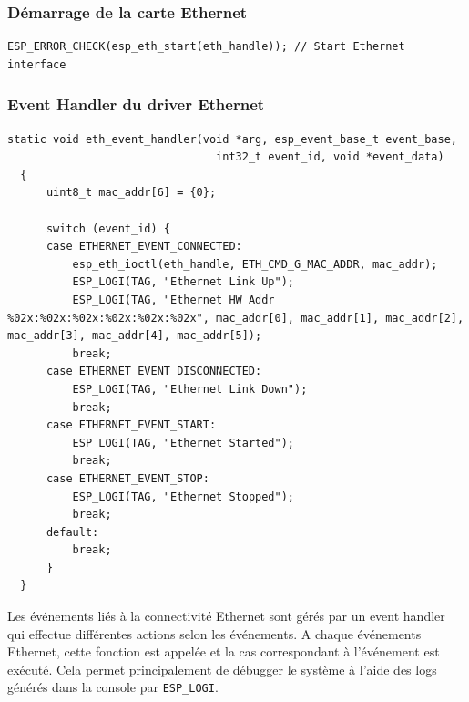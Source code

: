 \documentclass[a4paper,11pt]{article}
\begin{document}
        \vspace{0.5cm}
        \subsubsection{Démarrage de la carte Ethernet}
        \begin{lstlisting}[style=C, caption={Démarrage de la carte Ethernet}]
ESP_ERROR_CHECK(esp_eth_start(eth_handle)); // Start Ethernet interface
        \end{lstlisting}

        \newpage
        \subsubsection{Event Handler du driver Ethernet}
        \begin{lstlisting}[style=C, caption={Event Handler du driver Ethernet}]
  static void eth_event_handler(void *arg, esp_event_base_t event_base,
                                int32_t event_id, void *event_data)
  {
      uint8_t mac_addr[6] = {0};

      switch (event_id) {
      case ETHERNET_EVENT_CONNECTED:
          esp_eth_ioctl(eth_handle, ETH_CMD_G_MAC_ADDR, mac_addr);
          ESP_LOGI(TAG, "Ethernet Link Up");
          ESP_LOGI(TAG, "Ethernet HW Addr %02x:%02x:%02x:%02x:%02x:%02x", mac_addr[0], mac_addr[1], mac_addr[2], mac_addr[3], mac_addr[4], mac_addr[5]);
          break;
      case ETHERNET_EVENT_DISCONNECTED:
          ESP_LOGI(TAG, "Ethernet Link Down");
          break;
      case ETHERNET_EVENT_START:
          ESP_LOGI(TAG, "Ethernet Started");
          break;
      case ETHERNET_EVENT_STOP:
          ESP_LOGI(TAG, "Ethernet Stopped");
          break;
      default:
          break;
      }
  }
        \end{lstlisting}
        \vspace{0.5cm}

        Les événements liés à la connectivité Ethernet sont gérés par un event handler qui effectue différentes actions selon les événements.\newline
        A chaque événements Ethernet, cette fonction est appelée et la cas correspondant à l'événement est exécuté.\newline
        Cela permet principalement de débugger le système à l'aide des logs générés dans la console par \texttt{ESP\_LOGI}. 

        \newpage
\end{document}
